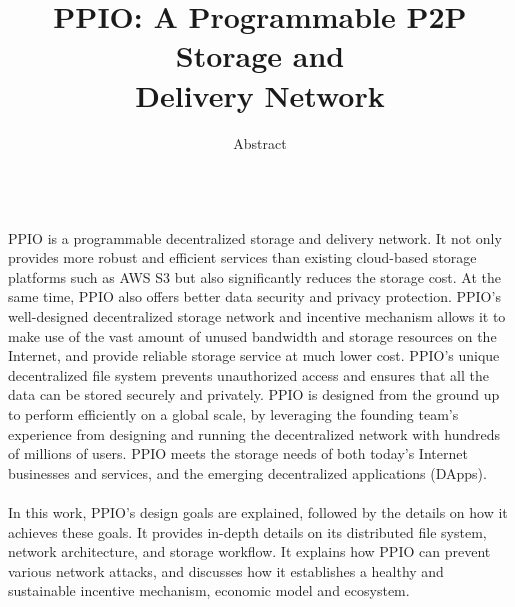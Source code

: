 \documentclass[10pt,a4paper]{article}
\title{ \LARGE\bf PPIO: A Programmable P2P Storage and\\Delivery Network}  %
\begin{document}
\maketitle%
\renewcommand{\baselinestretch}{1.2}
\author {\centerline{\Large Abstract}}
\noindent\\
PPIO is a programmable decentralized storage and delivery network. It not only provides more robust and efficient services than existing cloud-based storage platforms such as AWS S3 but also significantly reduces the storage cost. At the same time, PPIO also offers better data security and privacy protection. PPIO's well-designed decentralized storage network and incentive mechanism allows it to make use of the vast amount of unused bandwidth and storage resources on the Internet, and provide reliable storage service at much lower cost. PPIO's unique decentralized file system prevents unauthorized access and ensures that all the data can be stored securely and privately. PPIO is designed from the ground up to perform efficiently on a global scale, by leveraging the founding team's experience from designing and running the decentralized network with hundreds of millions of users. PPIO meets the storage needs of both today's Internet businesses and services, and the emerging decentralized applications (DApps).
\vspace{-0.5em}
\\ \\ In this work, PPIO's design goals are explained, followed by the details on how it achieves these goals. It provides in-depth details on its distributed file system, network architecture, and storage workflow. It explains how PPIO can prevent various network attacks, and discusses how it establishes a healthy and sustainable incentive mechanism, economic model and ecosystem.
\newpage
\tableofcontents %
\newpage
\end{document}
